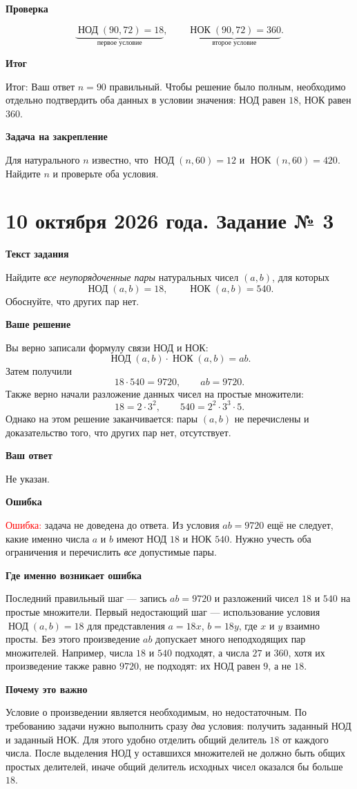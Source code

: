 \documentclass[12pt,a4paper]{article}
\newcommand{\gcdru}{\mathop{\text{НОД}}\nolimits}
\newcommand{\lcmru}{\mathop{\text{НОК}}\nolimits}
\newcommand{\subheading}[1]{\par\smallskip\textbf{#1}\par}
\begin{document}
\subheading{Проверка}
\[
\underbrace{\gcdru(90,72)=18}_{\text{первое условие}},
\qquad
\underbrace{\lcmru(90,72)=360}_{\text{второе условие}}.
\]

\subheading{Итог}
\textcolor{teal!60!black}{Итог:} Ваш ответ $n=90$ правильный. Чтобы решение было полным, необходимо отдельно подтвердить оба данных в условии значения: НОД равен $18$, НОК равен $360$.

\subheading{Задача на закрепление}
Для натурального $n$ известно, что $\gcdru(n,60)=12$ и $\lcmru(n,60)=420$. Найдите $n$ и проверьте оба условия.

\newpage
{}\label{task:oct10-3}
\section*{10 октября 2026 года. Задание № 3}

\subheading{Текст задания}
Найдите \emph{все неупорядоченные пары} натуральных чисел $(a,b)$, для которых
\[
\gcdru(a,b)=18,\qquad\lcmru(a,b)=540.
\]
Обоснуйте, что других пар нет.

\subheading{Ваше решение}
Вы верно записали формулу связи НОД и НОК:
\[
\gcdru(a,b)\cdot\lcmru(a,b)=ab.
\]
Затем получили
\[
18\cdot540=9720,\qquad ab=9720.
\]
Также верно начали разложение данных чисел на простые множители:
\[
18=2\cdot3^2,\qquad 540=2^2\cdot3^3\cdot5.
\]
Однако на этом решение заканчивается: пары $(a,b)$ не перечислены и доказательство того, что других пар нет, отсутствует.

\subheading{Ваш ответ}
Не указан.

\subheading{Ошибка}
\textcolor{red}{Ошибка:} задача не доведена до ответа. Из условия $ab=9720$ ещё не следует, какие именно числа $a$ и $b$ имеют НОД $18$ и НОК $540$. Нужно учесть оба ограничения и перечислить \emph{все} допустимые пары.

\subheading{Где именно возникает ошибка}
Последний правильный шаг --- запись $ab=9720$ и разложений чисел $18$ и $540$ на простые множители. Первый недостающий шаг --- использование условия $\gcdru(a,b)=18$ для представления $a=18x$, $b=18y$, где $x$ и $y$ взаимно просты. Без этого произведение $ab$ допускает много неподходящих пар множителей. Например, числа $18$ и $540$ подходят, а числа $27$ и $360$, хотя их произведение также равно $9720$, не подходят: их НОД равен $9$, а не $18$.

\subheading{Почему это важно}
Условие о произведении является необходимым, но недостаточным. По требованию задачи нужно выполнить сразу \emph{два} условия: получить заданный НОД и заданный НОК. Для этого удобно отделить общий делитель $18$ от каждого числа. После выделения НОД у оставшихся множителей не должно быть общих простых делителей, иначе общий делитель исходных чисел оказался бы больше $18$.
\end{document}
